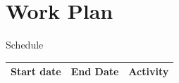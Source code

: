 \documentclass[compress]{beamer}
\begin{document}









\section{Work Plan}
\begin{frame}{Schedule}
\begin{center}
\scriptsize
\begin{tabular}{| l | l | c |}
	\hline
	Start date & End Date & Activity \\
	\hline
	
	\hline
\end{tabular}
\end{center}
\end{frame}
\end{document}
